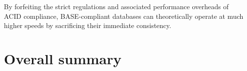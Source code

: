 \noindent By forfeiting the strict regulations and associated performance overheads of ACID compliance, BASE-compliant databases can 
theoretically operate at much higher speeds by sacrificing their immediate consistency.



\section{Overall summary}
